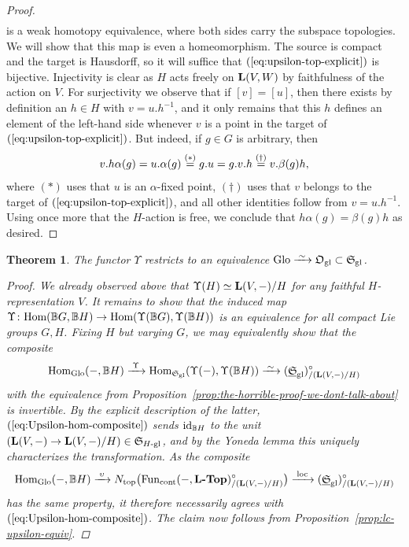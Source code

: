 \documentclass[reqno]{memo-l}
\theoremstyle{mythm}
\newtheorem{thm}{Theorem}[section]
\theoremstyle{definition}
\numberwithin{equation}{section}
\newcommand{\gl}{\textup{gl}}
\renewcommand{\hom}{\textup{hom}}
\newcommand{\Fun}{{\textup{Fun}}}
\newcommand{\Ntop}{{N_\textup{top}}}
\newcommand{\cat}[1]{\textbf{\textup{#1}}}
\renewcommand{\hom}{{\textup{Hom}}}
\newcommand{\id}{\textup{id}}
\newcommand{\Glo}{\textup{Glo}}
\newcommand{\BGcat}[1]{\mathbb B{#1}}
\newcommand{\ulhelper}[2]{\underline{\setbox0=\hbox{$#1#2$}\dp0=0.4pt \box0\relax}}
\newcommand{\ul}[1]{{\mathpalette\ulhelper{#1}}\hbox{\rule[-2pt]{0pt}{0pt}}}
\newcommand{\iso}{\xrightarrow{\;\smash{\raisebox{-0.25ex}{\ensuremath{\scriptstyle\sim}}}\;}}
\newcommand{\myS}{{{\mathfrak S\kern-.4pt}}}
\begin{document}
\begin{proof}
\begin{equation}
\begin{aligned}
        \end{aligned}
    \end{equation}
    is a weak homotopy equivalence, where both sides carry the subspace topologies. We will show that this map is even a homeomorphism. The source is compact and the target is Hausdorff, so it will suffice that $(\ref{eq:upsilon-top-explicit})$ is bijective. Injectivity is clear as $H$ acts freely on $\cat{L}(V,W)$ by faithfulness of the action on $V$. For surjectivity we observe that if $[v]=[u]$, then there exists by definition an $h\in H$ with $v=u.h^{-1}$, and it only remains that this $h$ defines an element of the left-hand side whenever $v$ is a point in the target of $(\ref{eq:upsilon-top-explicit})$. But indeed, if $g\in G$ is arbitrary, then
    \[
        v.h\alpha(g)=u.\alpha(g)\stackrel{(*)}{=}g.u=g.v.h\stackrel{\smash{(\dagger)}\vphantom{)}}{=}v.\beta(g)h,
    \]
    where $(*)$ uses that $u$ is an $\alpha$-fixed point, $(\dagger)$ uses that $v$ belongs to the target of $(\ref{eq:upsilon-top-explicit})$, and all other identities follow from $v=u.h^{-1}$. Using once more that the $H$-action is free, we conclude that $h\alpha(g)=\beta(g)h$ as desired.
\end{proof}

\begin{thm}\label{thm:Upsilon-ff}
    The functor $\Upsilon$ restricts to an equivalence $\Glo\iso\mathfrak O_\gl\subset\myS_\gl$.
    \begin{proof}
        We already observed above that $\Upsilon(H)\simeq\cat{L}(V,-)/H$ for any faithful $H$-representation $V$. It remains to show that the induced map $\Upsilon\colon\hom(\BGcat{G},\BGcat{H})\to\hom(\Upsilon(\BGcat{G}),\Upsilon(\BGcat{H}))$ is an equivalence for all compact Lie groups $G,H$. Fixing $H$ but varying $G$, we may equivalently show that the composite
        \begin{equation}\label{eq:Upsilon-hom-composite}
            \hom_{\Glo}(-,\BGcat{H})\xrightarrow{\;\Upsilon\;}\hom_{\myS_\gl}(\Upsilon(-),\Upsilon(\BGcat{H}))\iso(\ul\myS_\gl)_{/(\cat{L}(V,-)/H)}^\circ
        \end{equation}
        with the equivalence from Proposition~\ref{prop:the-horrible-proof-we-dont-talk-about} is invertible. By the explicit description of the latter, $(\ref{eq:Upsilon-hom-composite})$ sends $\id_{\BGcat{H}}$ to the unit $(\cat{L}(V,-)\to\cat{L}(V,-)/H)\in\myS_\text{$H$-gl}$, and by the Yoneda lemma this uniquely characterizes the transformation. As the composite
        \[
            \hom_{\Glo}(-,\BGcat{H})\xrightarrow{\;\upsilon\;}\Ntop\big(\Fun_\textup{cont}(-,\cat{$\cat{L}$-Top})_{/(\cat{L}(V,-)/H)}^\circ\big)\xrightarrow{\;\text{loc}\;}(\ul\myS_\gl)_{/(\cat{L}(V,-)/H)}^\circ
        \]
        has the same property, it therefore necessarily agrees with $(\ref{eq:Upsilon-hom-composite})$. The claim now follows from Proposition~\ref{prop:lc-upsilon-equiv}.
    \end{proof}
\end{thm}
\end{document}
